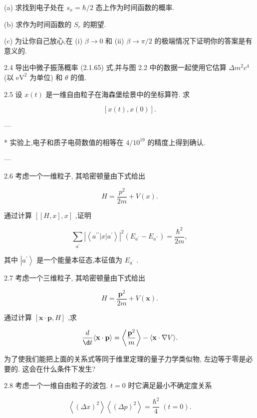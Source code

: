 \documentclass[lang=cn,newtx,10pt,scheme=chinese,thmcnt=section]{elegantbook}
\begin{document}
(a) 求找到电子处在 ${s}_{x} = \hbar /2$ 态上作为时间函数的概率.

(b) 求作为时间函数的 ${S}_{r}$ 的期望.

(c) 为让你自己放心,在 (i) $\beta \rightarrow 0$ 和 (ii) $\beta \rightarrow \pi /2$ 的极端情况下证明你的答案是有意义的.

2.4 导出中微子振荡概率 (2.1.65) 式,并与图 2.2 中的数据一起使用它估算 $\Delta {m}^{2}{c}^{4}$ (以 ${\mathrm{{eV}}}^{2}$ 为单位) 和 $\theta$ 的值.

2.5 设 $x\left( t\right)$ 是一维自由粒子在海森堡绘景中的坐标算符. 求

$$
\left\lbrack {x\left( t\right), x\left( 0\right) }\right\rbrack \text{.}
$$

---

* 实验上,电子和质子电荷数值的相等在 $4/{10}^{19}$ 的精度上得到确认.

---

2.6 考虑一个一维粒子, 其哈密顿量由下式给出

$$
H = \frac{{p}^{2}}{2m} + V\left( x\right) .
$$

通过计算 $\left\lbrack {\left\lbrack {H, x}\right\rbrack, x}\right\rbrack$ ,证明

$$
\mathop{\sum }\limits_{{a}^{\prime }}{\left| \left\langle {a}^{\prime \prime }\left| x\right| {a}^{\prime }\right\rangle \right| }^{2}\left( {{E}_{{a}^{\prime }} - {E}_{{a}^{\prime \prime }}}\right) = \frac{{\hbar }^{2}}{2m},
$$

其中 $\left| {a}^{\prime }\right\rangle$ 是一个能量本征态,本征值为 ${E}_{{a}^{\prime }}$ .

2.7 考虑一个三维粒子, 其哈密顿量由下式给出

$$
H = \frac{{\mathbf{p}}^{2}}{2m} + V\left( \mathbf{x}\right) .
$$

通过计算 $\left\lbrack {\mathbf{x} \cdot \mathbf{p}, H}\right\rbrack$ ,求

$$
\frac{d}{\d t}\langle \mathbf{x} \cdot \mathbf{p}\rangle = \left\langle \frac{{\mathbf{p}}^{2}}{m}\right\rangle - \langle \mathbf{x} \cdot \nabla V\rangle .
$$

为了使我们能把上面的关系式等同于维里定理的量子力学类似物, 左边等于零是必要的. 这会在什么条件下发生?

2.8 考虑一个一维自由粒子的波包. $t = 0$ 时它满足最小不确定度关系

$$
\left\langle {\left( \Delta x\right) }^{2}\right\rangle \left\langle {\left( \Delta p\right) }^{2}\right\rangle = \frac{{\hbar }^{2}}{4}\;\left( {t = 0}\right) .
$$
\end{document}
